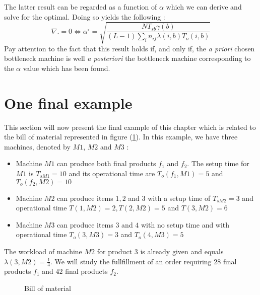 The latter result can be regarded as a function of $\alpha$ which we can derive and solve for the optimal. Doing so yields the following :
\[
    \nabla. = 0 \Leftrightarrow \alpha^\circ =
    \sqrt{
        \dfrac{
            NT_{sb}\gamma(b)
        }{
            (L-1)\sum_i n_{if}\lambda(i,b)T_o(i,b)
        }
    }
\]Pay attention to the fact that this result holds if, and only if, the \textit{a priori} chosen bottleneck machine is well \textit{a posteriori} the bottleneck machine corresponding to the $\alpha$ value which has been found. 

\section{One final example}

This section will now present the final example of this chapter which is related to the bill of material represented in figure (\ref{shared_res:bom3}). In this example, we have three machines, denoted by $M1$, $M2$ and $M3$ : 
\begin{itemize}
    \item Machine $M1$ can produce both final products $f_1$ and $f_2$. The setup time for $M1$ is $T_{sM1} = 10$ and its operational time are $T_o(f_1, M1) = 5$ and $T_o(f_2, M2) = 10$
    \item Machine $M2$ can produce items $1, 2$ and $3$ with a setup time of $T_{sM2} = 3$ and operational time $T(1, M2) = 2, T(2, M2)=5$ and $T(3, M2) = 6$
    \item Machine $M3$ can produce items $3$ and $4$ with no setup time and with operational time $T_o(3, M3) = 3$ and $T_o(4, M3) = 5$
\end{itemize}

The workload of machine $M2$ for product $3$ is already given and equals $\lambda(3, M2) = \frac{1}{4}$. We will study the fullfillment of an order requiring $28$ final products $f_1$ and $42$ final products $f_2$. 


\begin{figure}[h!]
    \centering
    \caption{\label{shared_res:bom3}Bill of material}
\end{figure}

